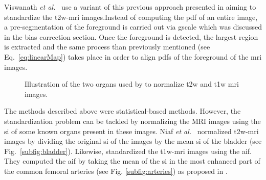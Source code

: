 \begin{enumerate}[leftmargin=*]
Viswanath \textit{et al.}~\cite{Viswanath2009,Viswanath2011,Viswanath2012} use a variant of this previous approach presented in \cite{Madabhushi2006a} aiming to standardize the \ac{t2w}-\ac{mri} images.Instead of computing the \ac{pdf} of an entire image, a pre-segmentation of the foreground is carried out via \ac{gscale} which was discussed in the bias correction section.
Once the foreground is detected, the largest region is extracted and the same process than previously mentioned (see Eq.~\eqref{eq:linearMap}) takes place in order to align \acp{pdf} of the foreground of the \ac{mri} images.

\begin{figure}
\centering
	\hspace*{\fill}
	 \hfill
	\hspace*{\fill}
	\caption{Illustration of the two organs used by \cite{Niaf2011,Niaf2012} to normalize \ac{t2w} and \ac{t1w} \ac{mri} images.}
	\label{fig:niaf}
\end{figure}

The methods described above were statistical-based methods.
However, the standardization problem can be tackled by normalizing the MRI images using the \ac{si} of some known organs present in these images. 
Niaf \textit{et al.}~\cite{Niaf2011,Niaf2012} normalized \ac{t2w}-\ac{mri} images by dividing the original \ac{si} of the images by the mean \ac{si} of the bladder (see Fig.~\ref{subfig:bladder}).
Likewise, \cite{Niaf2011} standardized the \ac{t1w}-\ac{mri} images using the \ac{aif}.
They computed the \ac{aif} by taking the mean of the \ac{si} in the most enhanced part of the common femoral arteries (see Fig. \ref{subfig:arteries}) as proposed in \cite{Wiart2007}.

\end{enumerate}


